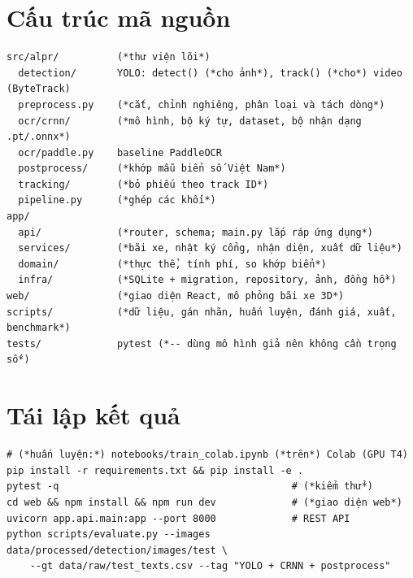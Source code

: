 \section{Cấu trúc mã nguồn}
\begin{lstlisting}
src/alpr/          (*thư viện lõi*)
  detection/       YOLO: detect() (*cho ảnh*), track() (*cho*) video (ByteTrack)
  preprocess.py    (*cắt, chỉnh nghiêng, phân loại và tách dòng*)
  ocr/crnn/        (*mô hình, bộ ký tự, dataset, bộ nhận dạng .pt/.onnx*)
  ocr/paddle.py    baseline PaddleOCR
  postprocess/     (*khớp mẫu biển số Việt Nam*)
  tracking/        (*bỏ phiếu theo track ID*)
  pipeline.py      (*ghép các khối*)
app/
  api/             (*router, schema; main.py lắp ráp ứng dụng*)
  services/        (*bãi xe, nhật ký cổng, nhận diện, xuất dữ liệu*)
  domain/          (*thực thể, tính phí, so khớp biển*)
  infra/           (*SQLite + migration, repository, ảnh, đồng hồ*)
web/               (*giao diện React, mô phỏng bãi xe 3D*)
scripts/           (*dữ liệu, gán nhãn, huấn luyện, đánh giá, xuất, benchmark*)
tests/             pytest (*-- dùng mô hình giả nên không cần trọng số*)
\end{lstlisting}

\section{Tái lập kết quả}
\begin{lstlisting}
# (*huấn luyện:*) notebooks/train_colab.ipynb (*trên*) Colab (GPU T4)
pip install -r requirements.txt && pip install -e .
pytest -q                                        # (*kiểm thử*)
cd web && npm install && npm run dev             # (*giao diện web*)
uvicorn app.api.main:app --port 8000             # REST API
python scripts/evaluate.py --images data/processed/detection/images/test \
    --gt data/raw/test_texts.csv --tag "YOLO + CRNN + postprocess"
\end{lstlisting}
